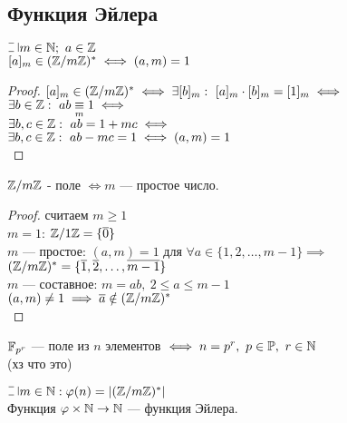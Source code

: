 \begin{normalsize}

\section{Функция Эйлера}

\begin{theorem-non}
    $\letus m \in \mathN;~a \in \mathZ$\\
    $[a]_m \in (\mathbb{Z}/m\mathbb{Z})^* \iff (a, m) = 1$
\end{theorem-non}

\begin{proof}
    $[a]_m \in (\mathbb{Z}/m\mathbb{Z})^* \iff \exists [b]_m:~[a]_m \cdot [b]_m = [1]_m \iff$\\
    $\exists b \in \mathbb{Z}:~ab \underset{m}{\equiv} 1 \iff$\\
    $\exists b, c \in \mathbb{Z}:~ab = 1 + mc \iff$\\
    $\exists b, c \in \mathbb{Z}:~ab - mc = 1 \iff (a, m) = 1$\\
\end{proof}

\begin{follow}
    $\mathbb{Z}/m\mathbb{Z}$ - поле $\iff m$ --- простое число.\\ 
\end{follow}

\begin{proof}
    считаем $m \geq 1$\\
    $m = 1$: $\mathbb{Z}/1\mathbb{Z} = \{\overline{0}\}$\\
    $m$ --- простое: $(a, m) = 1$ для $\forall a \in \{1, 2, \ldots, m-1\} \implies$\\
    $(\mathbb{Z}/m\mathbb{Z})^* = \{\overline{1}, \overline{2}, \ldots, \overline{m-1}\}$\\
    $m$ --- составное: $m = ab,~2 \leq a \leq m-1$\\
    $(a, m) \neq 1 \implies \overline{a} \notin (\mathbb{Z}/m\mathbb{Z})^*$\\
\end{proof}

\begin{defn}
    $\mathbb{F}_{p^r}$ --- поле из $n$ элементов $\iff n = p^r,~p \in \mathbb{P},~r \in \mathbb{N}$\\ 
    (хз что это)
\end{defn}

\begin{defn}
    $\letus m \in \mathN: \varphi(n) = |(\mathZ/m\mathZ)^*|$\\
    Функция $\varphi \times \mathbb{N} \to \mathbb{N}$ --- функция Эйлера.\\
\end{defn}


\end{normalsize}
